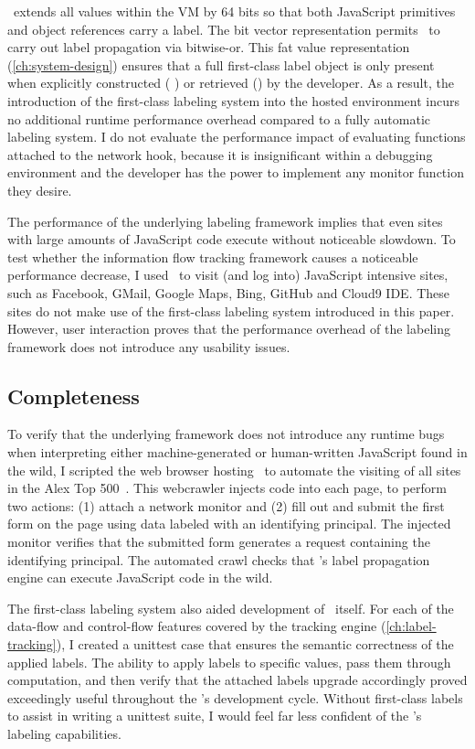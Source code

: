 \FlowCore\ extends all values within the VM by 64 bits so that both JavaScript primitives and object references carry a label.
The bit vector representation permits \FlowCore\ to carry out label propagation via bitwise-or.
This fat value representation (\autoref{ch:system-design}) ensures that a full first-class label object is only present when explicitly constructed ( \FlowLabel) or retrieved (\mlabelof) by the developer.
As a result, the introduction of the first-class labeling system into the hosted environment incurs no additional runtime performance overhead compared to a fully automatic labeling system.
I do not evaluate the performance impact of evaluating functions attached to the network hook, because it is insignificant within a debugging environment and the developer has the power to implement any monitor function they desire.

The performance of the underlying labeling framework implies that even sites with large amounts of JavaScript code execute without noticeable slowdown.
To test whether the information flow tracking framework causes a noticeable performance decrease, I used \FlowCore\ to visit (and log into) JavaScript intensive sites, such as Facebook, GMail, Google Maps, Bing, GitHub and Cloud9 IDE.
These sites do not make use of the first-class labeling system introduced in this paper.
However, user interaction proves that the performance overhead of the labeling framework does not introduce any usability issues.

\subsection{Completeness}

To verify that the underlying framework does not introduce any runtime bugs when interpreting either machine-generated or human-written JavaScript found in the wild, I scripted the web browser hosting \FlowCore\ to automate the visiting of all sites in the Alex Top 500~\cite{alexa}.
This webcrawler injects code into each page, to perform two actions: (1) attach a network monitor and (2) fill out and submit the first form on the page using data labeled with an identifying principal.
The injected monitor verifies that the submitted form generates a request containing the identifying principal.
The automated crawl checks that \FlowCore's label propagation engine can execute JavaScript code in the wild.

The first-class labeling system also aided development of \FlowCore\ itself.
For each of the data-flow and control-flow features covered by the tracking engine (\autoref{ch:label-tracking}), I created a unittest case that ensures the semantic correctness of the applied labels.
The ability to apply labels to specific values, pass them through computation, and then verify that the attached labels upgrade accordingly proved exceedingly useful throughout the \FlowCore's development cycle.
Without first-class labels to assist in writing a unittest suite, I would feel far less confident of the \FlowCore's labeling capabilities.

